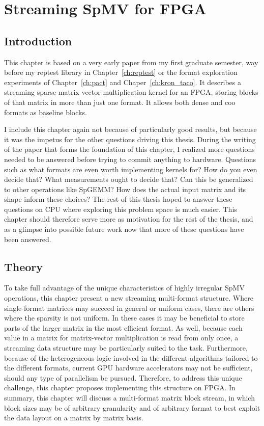 \chapter{Streaming SpMV for FPGA}
\label{ch:fpga}

\section{Introduction}
This chapter is based on a very early paper from my first graduate semester, way before my reptest library in Chapter~\ref{ch:reptest} or the format exploration experiments of Chapter~\ref{ch:pact} and Chaper~\ref{ch:kron_taco}. It describes a streaming sparse-matrix vector multiplication kernel for an FPGA, storing
blocks of that matrix in more than just one format. It allows both dense and coo formats as baseline blocks.

I include this chapter again not because of particularly good results, but because it was the impetus for the other questions driving this thesis. During the writing of the paper that forms the foundation of this chapter, I realized more questions needed to be answered before trying to commit anything to hardware. Questions such as
what formats are even worth implementing kernels for? How do you even decide that? What measurements ought to decide that? Can this be generalized to other operations like SpGEMM? How does the actual input matrix and its shape inform these choices? The rest of this thesis hoped to answer these questions on CPU where exploring
this problem space is much easier. This chapter should therefore serve more as motivation for the rest of the thesis, and as a glimpse into possible future work now that more of these questions have been answered.

\section{Theory}
To take full advantage of the unique characteristics of highly irregular SpMV operations, this chapter present a new streaming multi-format structure. Where single-format matrices may succeed in general or uniform cases, there are others where the sparsity is not uniform. In these cases it may be beneficial to store parts of the larger matrix in the most efficient format. As well, because each value in a matrix for matrix-vector multiplication is read from only once, a streaming data structure may be particularly suited to the task. Furthermore, because of the heterogeneous logic involved in the different algorithms tailored to the different formats, current GPU hardware accelerators may not be sufficient, should any type of parallelism be pursued. Therefore, to address this unique challenge, this chapter proposes implementing this structure on FPGA. In summary, this chapter will discuss a multi-format matrix block stream, in which block sizes may be of arbitrary granularity and of arbitrary format to best exploit the data layout on a matrix by matrix basis.

